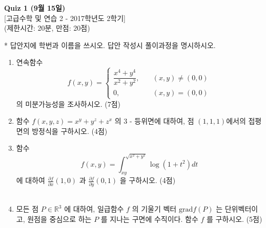 \documentclass[12pt]{article}
\begin{document}
\begin{center}
\textbf{Quiz 1 (9월 15일)}\\
{[고급수학 및 연습 2 - 2017학년도 2학기]}\\
(제한시간: 20분, 만점: 20점)\\
\end{center}

* 답안지에 학번과 이름을 쓰시오. 답안 작성시 풀이과정을 명시하시오.\\

\begin{enumerate}
\item 연속함수
$$
	f(x, y) = \begin{cases}
    \dfrac{x^4+y^4}{x^2+y^2},       & \quad (x, y) \neq (0, 0)\\
    0,  & \quad (x, y) = (0, 0)
  \end{cases}
$$ 의 미분가능성을 조사하시오. (7점) 
~\\
\item 함수 $f(x, y, z)=x^y+y^z+z^x$ 의 $3$ - 등위면에 대하여, 점 $(1, 1, 1)$에서의 접평면의 방정식을 구하시오. (4점)
~\\
\item 함수 $$f(x, y)= \int_{xy}^{\sqrt{x^2+y^2}} \log{(1+t^2)} dt$$ 에 대하여 $\displaystyle \frac{\partial f}{\partial x}(1, 0)$ 과 $\displaystyle \frac{\partial f}{\partial y}(0, 1)$ 을 구하시오. (4점)
~\\\\
\item 모든 점 $P\in \mathbb{R}^3$ 에 대하여, 일급함수 $f$ 의 기울기 벡터 $\text{grad} f(P)$ 는 단위벡터이고, 원점을 중심으로 하는 $P$ 를 지나는 구면에 수직이다. 함수 $f$ 를 구하시오. (5점)

\end{enumerate}
\end{document}
